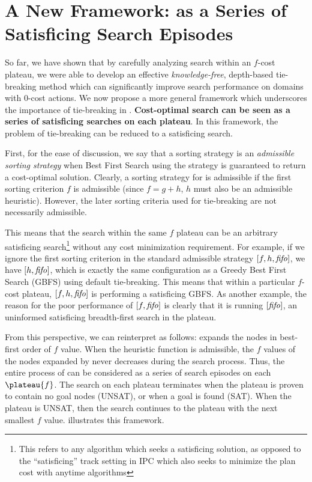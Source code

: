 \clearpage 
\section{A New Framework:  \astar as a Series of Satisficing Search Episodes}
\label{sec:discussion}

So far, we have shown that by carefully analyzing search within an $f$-cost plateau,
we were able to develop an effective
{\it knowledge-free}, depth-based tie-breaking method which can significantly improve search performance on domains with 0-cost actions.
We now propose a more general framework which underscores the importance of tie-breaking in \astar.
\textbf{Cost-optimal search
can be seen as a series of satisficing searches on each plateau}. In this framework, the problem of tie-breaking can be
reduced to a satisficing search.

First, for the ease of discussion, 
we say that a sorting strategy is an \emph{admissible sorting strategy}
when Best First Search using the strategy is guaranteed to return a cost-optimal solution.
Clearly, a sorting strategy for \astar is admissible if %
the first sorting criterion $f$ is admissible (since $f=g+h$, $h$ must also be an admissible heuristic).
However, the later sorting criteria used for tie-breaking are not necessarily admissible.

This means that the search within the same $f$ plateau can be an arbitrary  satisficing search\footnote{This refers to any algorithm which seeks a satisficing solution, as opposed to the ``satisficing'' track setting in IPC which also seeks to minimize the plan cost with anytime algorithms} without any cost minimization requirement. For example,
if we ignore the first sorting criterion in the standard admissible strategy
$[f,h,{\text{\textit{fifo}}}]$, we have $[h,{\text{\textit{fifo}}}]$, which is exactly
the same configuration as a Greedy Best First Search (GBFS) using \fifo default tie-breaking. This 
means that within a particular $f$-cost plateau, $[f,h,{\text{\textit{fifo}}}]$ is
performing a satisficing GBFS.
As another example, the reason for the poor performance of $[f,{\text{\textit{fifo}}}]$
is clearly that it is running $[{\text{\textit{fifo}}}]$,
an uninformed satisficing breadth-first search in the plateau.

From this perspective, we can reinterpret \astar as follows: \astar expands the nodes in best-first order of $f$ value. When the
heuristic function is admissible, the $f$ values of the nodes expanded by \astar never decreases during the
search process.
Thus, the entire process of \astar can be considered as a series of search episodes on each $\plateau{f}$.
The search on each plateau terminates when the plateau is proven to contain no goal nodes (UNSAT), or when a goal is found (SAT).
When the plateau is UNSAT, then the search continues to the plateau with the next smallest $f$ value.
 illustrates this framework.

